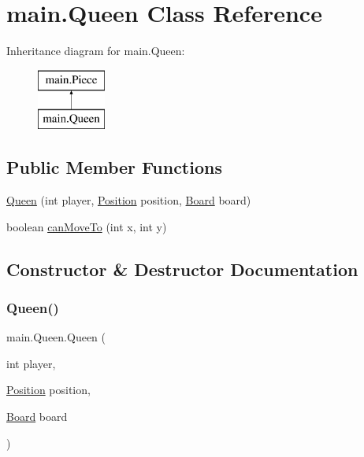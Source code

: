 \hypertarget{classmain_1_1_queen}{}\section{main.\+Queen Class Reference}
\label{classmain_1_1_queen}
Inheritance diagram for main.\+Queen\+:\begin{figure}[H]
\begin{center}
\leavevmode
\includegraphics[height=2.000000cm]{classmain_1_1_queen}
\end{center}
\end{figure}
\subsection*{Public Member Functions}
\begin{DoxyCompactItemize}
\item 
\hyperlink{classmain_1_1_queen_a421f06bd817355da26730ba2c9b87dc1}{Queen} (int player, \hyperlink{classmain_1_1_position}{Position} position, \hyperlink{classmain_1_1_board}{Board} board)
\item 
boolean \hyperlink{classmain_1_1_queen_a9cfd9c6f093ffad8c10d9fba088595dc}{can\+Move\+To} (int x, int y)
\end{DoxyCompactItemize}


\subsection{Constructor \& Destructor Documentation}
\mbox{\label{classmain_1_1_queen_a421f06bd817355da26730ba2c9b87dc1}} 
\subsubsection{\texorpdfstring{Queen()}{Queen()}}
{\footnotesize\ttfamily main.\+Queen.\+Queen (\begin{DoxyParamCaption}\item[{int}]{player,  }\item[{\hyperlink{classmain_1_1_position}{Position}}]{position,  }\item[{\hyperlink{classmain_1_1_board}{Board}}]{board }\end{DoxyParamCaption})}

